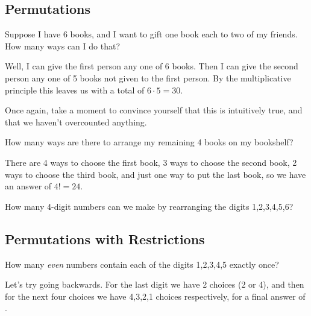 \documentclass{scrartcl}
\begin{document}
	\subsection{Permutations}
	\begin{example}
		Suppose I have 6 books, and I want to gift one book each to two of my friends.  How many ways can I do that?
	\end{example}
	\begin{soln}
		Well, I can give the first person any one of 6 books. Then I can give the second person any one of 5 books not given to the first person. By the multiplicative principle this leaves us with a total of $6 \cdot 5 = \boxed{30}$.
	\end{soln}
	\begin{exercise}
		Once again, take a moment to convince yourself that this is intuitively true, and that we haven't overcounted anything.
	\end{exercise}
	\begin{example}
		How many ways are there to arrange my remaining 4 books on my bookshelf?
	\end{example}
	\begin{soln}
	There are 4 ways to choose the first book, 3 ways to choose the second book, 2 ways to choose the third book, and just one way to put the last book, so we have an answer of $4! = \boxed{24}$.
	\end{soln}
	\begin{exercise}
		How many 4-digit numbers can we make by rearranging the digits 1,2,3,4,5,6?
	\end{exercise}
	\subsection{Permutations with Restrictions}
	\begin{example}
		How many \emph{even} numbers contain each of the digits 1,2,3,4,5 exactly once?
	\end{example}
	\begin{soln}
		Let's try going backwards. For the last digit we have 2 choices (2 or 4), and then for the next four choices we have 4,3,2,1 choices respectively, for a final answer of .
	\end{soln}
\end{document}
